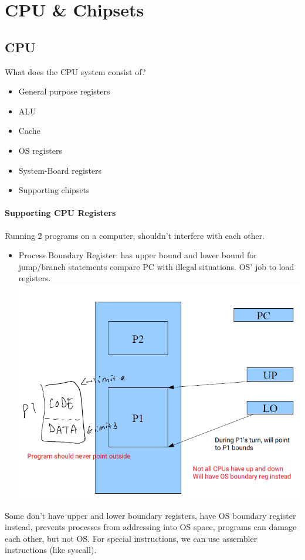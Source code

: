 \documentclass[12 pt]{article}
\begin{document}
\section{CPU \& Chipsets}
\subsection{CPU}
What does the CPU system consist of?
\begin{itemize}
\item General purpose registers
\item ALU
\item Cache
\item OS registers
\item System-Board registers
\item Supporting chipsets
\end{itemize}
\paragraph{Supporting CPU Registers}
Running 2 programs on a computer, shouldn't interfere with each other.
\begin{itemize}
\item Process Boundary Register: has upper bound and lower bound for jump/branch statements compare PC with illegal situations. OS' job to load registers.
\\ \includegraphics[scale=0.7]{pbd}
\end{itemize}
Some don't have upper and lower boundary registers, have OS boundary register instead, prevents processes from addressing into OS space, programs can damage each other, but not OS. For special instructions, we can use assembler instructions (like syscall).
\end{document}
